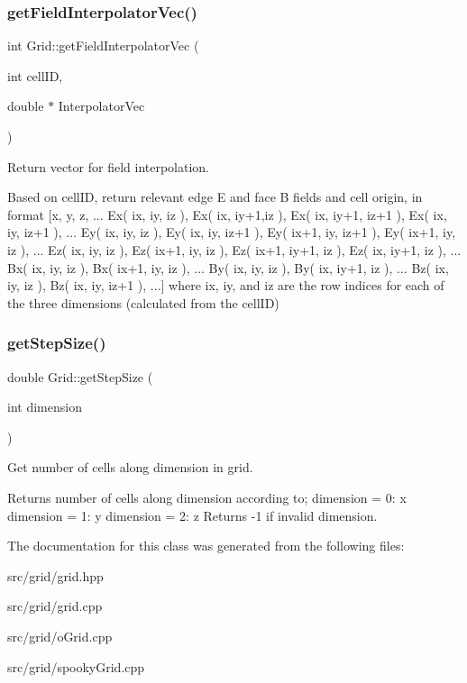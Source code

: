 \subsubsection{\texorpdfstring{get\+Field\+Interpolator\+Vec()}{getFieldInterpolatorVec()}}
{\footnotesize\ttfamily int Grid\+::get\+Field\+Interpolator\+Vec (\begin{DoxyParamCaption}\item[{int}]{cell\+ID,  }\item[{double $\ast$}]{Interpolator\+Vec }\end{DoxyParamCaption})}



Return vector for field interpolation. 

Based on cell\+ID, return relevant edge E and face B fields and cell origin, in format \mbox{[}x, y, z, ... Ex( ix, iy, iz ), Ex( ix, iy+1,iz ), Ex( ix, iy+1, iz+1 ), Ex( ix, iy, iz+1 ), ... Ey( ix, iy, iz ), Ey( ix, iy, iz+1 ), Ey( ix+1, iy, iz+1 ), Ey( ix+1, iy, iz ), ... Ez( ix, iy, iz ), Ez( ix+1, iy, iz ), Ez( ix+1, iy+1, iz ), Ez( ix, iy+1, iz ), ... Bx( ix, iy, iz ), Bx( ix+1, iy, iz ), ... By( ix, iy, iz ), By( ix, iy+1, iz ), ... Bz( ix, iy, iz ), Bz( ix, iy, iz+1 ), ...\mbox{]} where ix, iy, and iz are the row indices for each of the three dimensions (calculated from the cell\+ID) \hypertarget{class_grid_a7c37daac383190622c7cf37597101510}{}\label{class_grid_a7c37daac383190622c7cf37597101510} 
\subsubsection{\texorpdfstring{get\+Step\+Size()}{getStepSize()}}
{\footnotesize\ttfamily double Grid\+::get\+Step\+Size (\begin{DoxyParamCaption}\item[{int}]{dimension }\end{DoxyParamCaption})}



Get number of cells along dimension in grid. 

Returns number of cells along dimension according to; dimension = 0\+: x dimension = 1\+: y dimension = 2\+: z Returns -\/1 if invalid dimension. 

The documentation for this class was generated from the following files\+:\begin{DoxyCompactItemize}
\item 
src/grid/grid.\+hpp\item 
src/grid/grid.\+cpp\item 
src/grid/o\+Grid.\+cpp\item 
src/grid/spooky\+Grid.\+cpp\end{DoxyCompactItemize}
